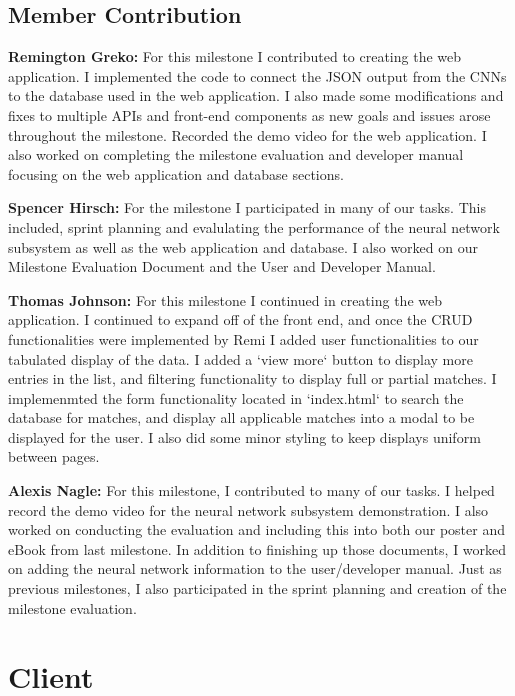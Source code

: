 \documentclass[12pt]{article}
\begin{document}
\medskip

\subsection{Member Contribution}

\noindent\textbf{Remington Greko:} For this milestone I contributed to creating the web application. I implemented the code to connect the JSON output from the CNNs to the 
database used in the web application. I also made some modifications and fixes to multiple APIs and front-end components as new goals and issues arose throughout
the milestone. Recorded the demo video for the web application. I also worked on completing the milestone evaluation and developer manual focusing on the web application 
and database sections.

\medskip

\noindent\textbf{Spencer Hirsch:} For the milestone I participated in many of our tasks. This included, sprint planning and 
evalulating the performance of the neural network subsystem as well as the web application and database. I also worked on
our Milestone Evaluation Document and the User and Developer Manual.

\medskip

\noindent\textbf{Thomas Johnson:} For this milestone I continued in creating the web application. I continued to expand off of the front end, and once the CRUD functionalities were 
implemented by Remi I added user functionalities to our tabulated display of the data. I added a `view more` button to display more entries in the list, and filtering functionality
to display full or partial matches. I implemenmted the form functionality located in `index.html` to search the database for matches, and display all applicable matches into a modal 
to be displayed for the user. I also did some minor styling to keep displays uniform between pages.
\medskip

\noindent\textbf{Alexis Nagle:} For this milestone, I contributed to many of our tasks. I helped record the demo video for the 
neural network subsystem demonstration. I also worked on conducting the evaluation and including this into both our poster and 
eBook from last milestone. In addition to finishing up those documents, I worked on adding the neural network information to the 
user/developer manual. Just as previous milestones, I also participated in the sprint planning and creation of the milestone evaluation. 

\section{Client}
\end{document}
